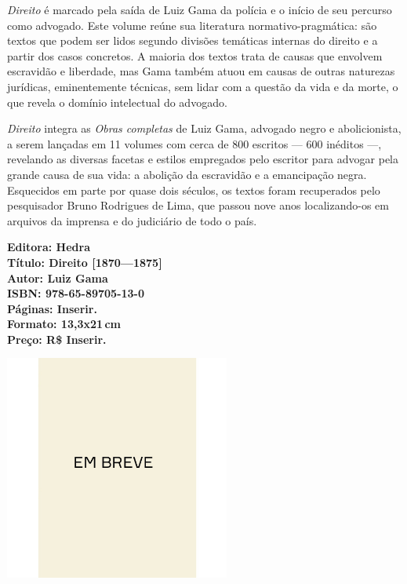 \noindent{}\textit{Direito} é marcado pela saída de Luiz Gama da polícia e o início de seu percurso como advogado. Este volume reúne sua literatura normativo-pragmática: são textos que podem ser lidos segundo divisões temáticas internas do direito e a partir dos casos concretos. A maioria dos textos trata de causas que envolvem escravidão e liberdade, mas Gama também atuou em causas de outras naturezas jurídicas, eminentemente técnicas, sem lidar com a questão da vida e da morte, o que revela o domínio intelectual do advogado.

\textit{Direito} integra as \textit{Obras completas} de Luiz Gama, advogado negro e abolicionista, a serem lançadas em 11 volumes com cerca de 800 escritos --- 600 inéditos ---, revelando as diversas facetas e estilos empregados pelo escritor para advogar pela grande causa de sua vida: a abolição da escravidão e a emancipação negra. Esquecidos em parte por quase dois séculos, os textos foram recuperados pelo pesquisador Bruno Rodrigues de Lima, que passou nove anos localizando-os em arquivos da imprensa e do judiciário de todo o país.

\vfill
\noindent\begin{minipage}[c]{1\linewidth}
{\small\textbf{
\hspace*{-.1cm}Editora: Hedra\\
Título: Direito [1870—1875]\\
Autor: Luiz Gama\\ 
ISBN: 978-65-89705-13-0\\
Páginas: Inserir.\\
Formato: 13,3x21\,cm\\
Preço: R\$ Inserir.\\
}}
\end{minipage}
\pagebreak

\begin{center}
\hspace*{.5cm}\includegraphics[width=74mm]{./CAPAS/breve.jpeg}
\end{center}
\hspace*{-7cm}\hrulefill\hspace*{-7cm}
\medskip

